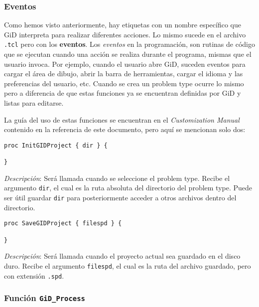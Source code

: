 \documentclass[10pt, a4paper, twocolumn]{article} %
\begin{document}
\subsubsection{Eventos} \label{sec:eventosGiD}

Como hemos visto anteriormente, hay etiquetas con un nombre específico que GiD interpreta para realizar diferentes acciones. Lo mismo sucede en el archivo \texttt{.tcl} pero con los \textbf{eventos}. Los \textit{eventos} en la programación, son rutinas de código que se ejecutan cuando una acción se realiza durante el programa, mismas que el usuario invoca. Por ejemplo, cuando el usuario abre GiD, suceden eventos para cargar el área de dibujo, abrir la barra de herramientas, cargar el idioma y las preferencias del usuario, etc. Cuando se crea un problem type ocurre lo mismo pero a diferencia de que estas funciones ya se encuentran definidas por GiD y listas para editarse.

La guía del uso de estas funciones se encuentran en el \textit{Customization Manual} contenido en la referencia de este documento, pero aquí se mencionan solo dos:

\lstset{language=tcl} 
\begin{lstlisting}[caption={Evento que se ejecuta al iniciar el problemtype.}]
proc InitGIDProject { dir } {

}
\end{lstlisting}

\textit{Descripción}: Será llamada cuando se seleccione el problem type. Recibe el argumento \texttt{dir}, el cual es la ruta absoluta del directorio del problem type. Puede ser útil guardar \texttt{dir} para posteriormente  acceder a otros archivos dentro del directorio.

\begin{lstlisting}[caption={Evento que se ejecuta al guardar un proyecto en GiD durante la ejecución de un problem type.}]
proc SaveGIDProject { filespd } {

}
\end{lstlisting}

\textit{Descripción}: Será llamada cuando el proyecto actual sea guardado en el disco duro. Recibe el argumento \texttt{filespd}, el cual es la ruta del archivo guardado, pero con extensión \texttt{.spd}.

\subsubsection{Función \texttt{GiD\_Process}} \label{sec:GiDProcess}
\end{document}
